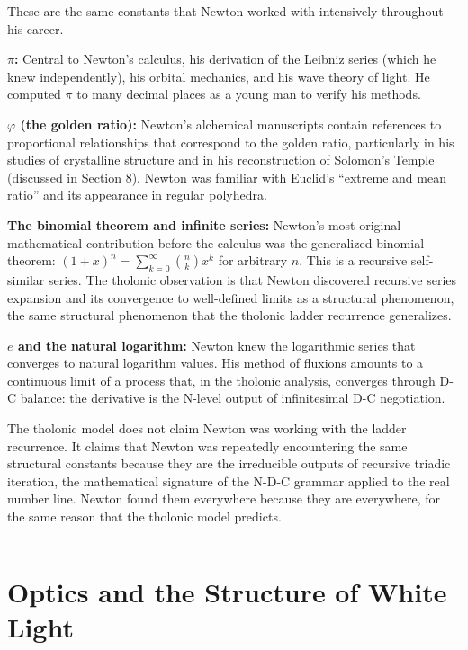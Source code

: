 \documentclass[12pt]{article}
\begin{document}
These are the same constants that Newton worked with intensively
throughout his career.

\textbf{\(\pi\):} Central to Newton's calculus, his derivation of the
Leibniz series (which he knew independently), his orbital mechanics, and
his wave theory of light. He computed \(\pi\) to many decimal places as
a young man to verify his methods.

\textbf{\(\varphi\) (the golden ratio):} Newton's alchemical manuscripts
contain references to proportional relationships that correspond to the
golden ratio, particularly in his studies of crystalline structure and
in his reconstruction of Solomon's Temple (discussed in Section 8).
Newton was familiar with Euclid's ``extreme and mean ratio'' and its
appearance in regular polyhedra.

\textbf{The binomial theorem and infinite series:} Newton's most
original mathematical contribution before the calculus was the
generalized binomial theorem:
\((1 + x)^n = \sum_{k=0}^{\infty} \binom{n}{k} x^k\) for arbitrary
\(n\). This is a recursive self-similar series. The tholonic observation
is that Newton discovered recursive series expansion and its convergence
to well-defined limits as a structural phenomenon, the same structural
phenomenon that the tholonic ladder recurrence generalizes.

\textbf{\(e\) and the natural logarithm:} Newton knew the logarithmic
series that converges to natural logarithm values. His method of
fluxions amounts to a continuous limit of a process that, in the
tholonic analysis, converges through D-C balance: the derivative is the
N-level output of infinitesimal D-C negotiation.

The tholonic model does not claim Newton was working with the ladder
recurrence. It claims that Newton was repeatedly encountering the same
structural constants because they are the irreducible outputs of
recursive triadic iteration, the mathematical signature of the N-D-C
grammar applied to the real number line. Newton found them everywhere
because they are everywhere, for the same reason that the tholonic model
predicts.

\begin{center}\rule{0.5\linewidth}{0.5pt}\end{center}

\section{Optics and the Structure of White Light}\label{optics-and-the-structure-of-white-light}
\end{document}

